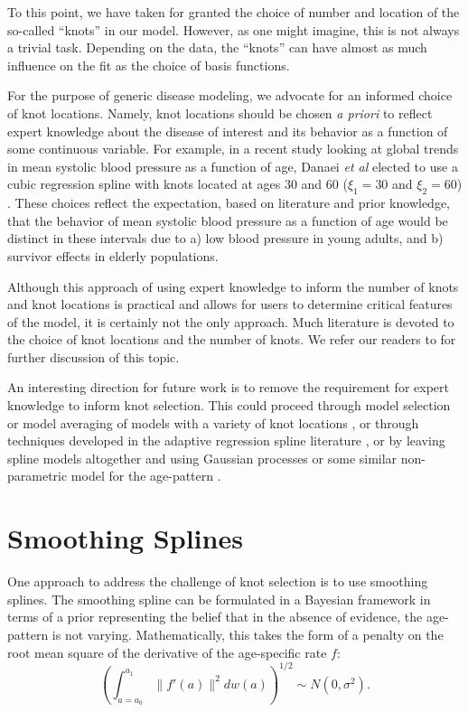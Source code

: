 To this point, we have taken for granted the choice of number and
location of the so-called ``knots'' in our model. However, as one
might imagine, this is not always a trivial task. Depending on the
data, the ``knots'' can have almost as much influence on the fit as
the choice of basis functions.

For the purpose of generic disease modeling, we advocate for an
informed choice of knot locations. Namely, knot locations should be
chosen \emph{a priori} to reflect expert knowledge about the disease
of interest and its behavior as a function of some continuous
variable. For example, in a recent study looking at global trends in
mean systolic blood pressure as a function of age, Danaei \emph{et al}
elected to use a cubic regression spline with knots located at ages 30
and 60 ($\xi_1 = 30$ and $\xi_2=60$) \cite{Danaei_National_2011}. These
choices reflect the expectation, based on literature and prior
knowledge, that the behavior of mean systolic blood pressure as a
function of age would be distinct in these intervals due to a) low
blood pressure in young adults, and b) survivor effects in elderly
populations.

Although this approach of using expert knowledge to inform the number
of knots and knot locations is practical and allows for users to
determine critical features of the model, it is certainly not the only
approach. Much literature is devoted to the choice of knot locations
and the number of knots. We refer our readers to \cite{ESL,
  Wand2001[KP2]} for further discussion of this topic.

An interesting direction for future work is to remove the requirement
for expert knowledge to inform knot selection.  This could proceed
through model selection or model averaging of models with a variety of
knot locations \cite{[ref baysian model averaging[KP3]]}, or through
techniques developed in the adaptive regression spline literature
\cite{[ref[KP4]]}, or by leaving spline models altogether and using Gaussian
processes or some similar non-parametric model for the age-pattern
\cite{[ref GP[KP5]]}.

\section{Smoothing Splines}
One approach to address the challenge of knot selection is to use
smoothing splines.  The smoothing spline can be formulated in a
Bayesian framework in terms of a prior representing the belief that in
the absence of evidence, the age-pattern is not varying.
Mathematically, this takes the form of a penalty on the root mean
square of the derivative of the age-specific rate $f$:
\[
\left(\int _{a=a_0} ^{a_1} \| f'(a) \|^2 dw(a)\right)^{1/2} \sim N(0, \sigma^2).
\]

